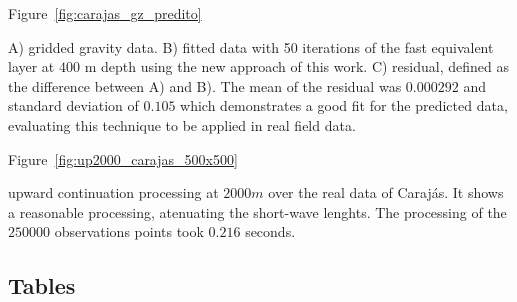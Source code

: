 \documentclass[paper]{geophysics}
\begin{document}
Figure~\ref{fig:carajas_gz_predito}

{A) gridded gravity data. B) fitted data with 50 iterations of the fast equivalent layer at $400$ m depth using the new approach of this work. C) residual, defined as the difference between A) and B). The mean of the residual was $0.000292$ and standard deviation of $0.105$ which demonstrates a good fit for the predicted data, evaluating this technique to be applied in real field data.}
\newpage

Figure~\ref{fig:up2000_carajas_500x500}

{upward continuation processing at $2000 m$ over the real data of Caraj\'as. It shows a reasonable processing, atenuating the short-wave lenghts. The processing of the $250000$ observations points took $0.216$ seconds.}
\newpage

%
%

\subsection{Tables}
\end{document}
